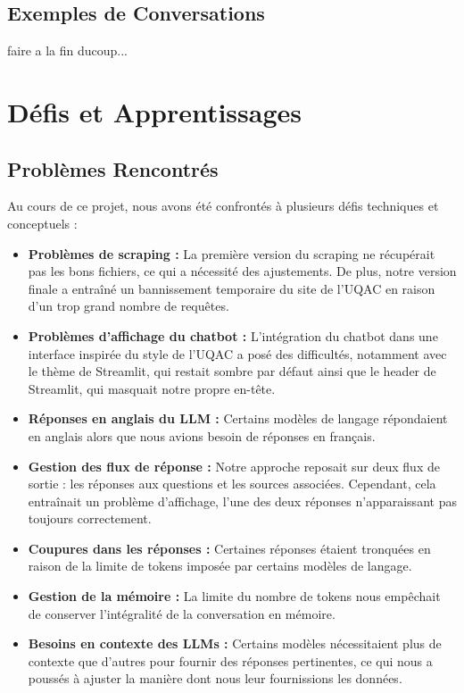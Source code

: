 \documentclass{article}
\begin{document}
\subsection{Exemples de Conversations}
faire a la fin ducoup...
\clearpage

\section{Défis et Apprentissages}
\subsection{Problèmes Rencontrés}

Au cours de ce projet, nous avons été confrontés à plusieurs défis techniques et conceptuels :

\begin{itemize}
    \item \textbf{Problèmes de scraping :} La première version du scraping ne récupérait pas les bons fichiers, ce qui a nécessité des ajustements. De plus, notre version finale a entraîné un bannissement temporaire du site de l'UQAC en raison d'un trop grand nombre de requêtes.
    \item \textbf{Problèmes d'affichage du chatbot :} L'intégration du chatbot dans une interface inspirée du style de l'UQAC a posé des difficultés, notamment avec le thème de Streamlit, qui restait sombre par défaut ainsi que le header de Streamlit, qui masquait notre propre en-tête.
    \item \textbf{Réponses en anglais du LLM :} Certains modèles de langage répondaient en anglais alors que nous avions besoin de réponses en français.
    \item \textbf{Gestion des flux de réponse :} Notre approche reposait sur deux flux de sortie : les réponses aux questions et les sources associées. Cependant, cela entraînait un problème d'affichage, l'une des deux réponses n'apparaissant pas toujours correctement.
    \item \textbf{Coupures dans les réponses :} Certaines réponses étaient tronquées en raison de la limite de tokens imposée par certains modèles de langage.
    \item \textbf{Gestion de la mémoire :} La limite du nombre de tokens nous empêchait de conserver l'intégralité de la conversation en mémoire.
    \item \textbf{Besoins en contexte des LLMs :} Certains modèles nécessitaient plus de contexte que d'autres pour fournir des réponses pertinentes, ce qui nous a poussés à ajuster la manière dont nous leur fournissions les données.
\end{itemize}
\end{document}
